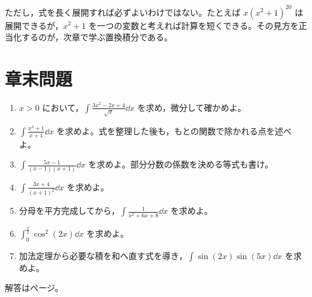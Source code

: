 ただし，式を長く展開すれば必ずよいわけではない。たとえば $x(x^2+1)^{20}$ は展開できるが，$x^2+1$ を一つの変数と考えれば計算を短くできる。その見方を正当化するのが，次章で学ぶ置換積分である。

\section*{章末問題}
\begin{enumerate}[label=\textbf{\thechapter.\arabic*},leftmargin=*]
 \item\label{問:基本べき} $x>0$ において，$\int\frac{3x^2-2x+4}{\sqrt{x}}\dd x$ を求め，微分して確かめよ。
 \item\label{問:基本割算} $\int\frac{x^3+1}{x+1}\dd x$ を求めよ。式を整理した後も，もとの関数で除かれる点を述べよ。
 \item\label{問:基本部分分数} $\int\frac{5x-1}{(x-1)(x+1)}\dd x$ を求めよ。部分分数の係数を決める等式も書け。
 \item\label{問:基本重因子} $\int\frac{3x+4}{(x+1)^2}\dd x$ を求めよ。
 \item\label{問:基本平方完成} 分母を平方完成してから，$\int\frac1{x^2+6x+8}\dd x$ を求めよ。
 \item\label{問:基本三角二乗} $\int_0^{\frac\pi2}\cos^2(2x)\dd x$ を求めよ。
 \item\label{問:基本三角積} 加法定理から必要な積を和へ直す式を導き，$\int\sin(2x)\sin(5x)\dd x$ を求めよ。
\end{enumerate}

\smallskip\noindent 解答は\pageref{解答:第4章}ページ。
